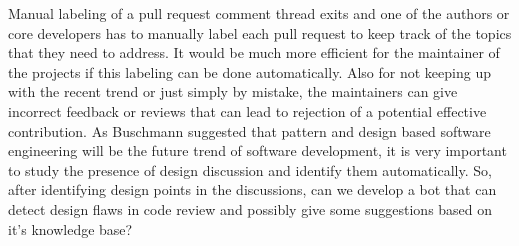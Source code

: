 Manual labeling of a pull request comment thread exits and one of the authors or core developers has to manually label each pull request to keep track of the topics that they need to address. It would be much more efficient for the maintainer of the projects if this labeling can be done automatically. Also for not keeping up with the recent trend or just simply by mistake, the maintainers can give incorrect feedback or reviews that can lead to rejection of a potential effective contribution. As Buschmann \cite{Buschmann2007} suggested that pattern and design based software engineering will be the future trend of software development, it is very important to study the presence of design discussion and identify them automatically. So, after identifying design points in the discussions, can we develop a bot that can detect design flaws in code review and possibly give some suggestions based on it's knowledge base?        


   
